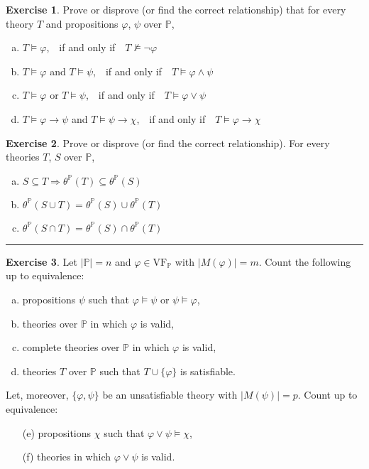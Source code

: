 \documentclass{amsart}
\theoremstyle{definition}
\newtheorem{problem}{Exercise}
\begin{document}
\begin{problem}
Prove or disprove (or find the correct relationship) that for every theory $T$ and propositions $\varphi$, $\psi$ over $\mathbb{P}$,
\begin{enumerate}[(a)]
\item $T \models \varphi$,\ \  if and only if\ \ $T \not\models \neg \varphi$
\item $T \models \varphi$ and $T \models \psi$,\ \ if and only if\ \ $T \models \varphi \wedge \psi$
\item $T \models \varphi$ or $T \models \psi$,\ \ if and only if\ \ $T \models \varphi \vee \psi$
\item $T \models \varphi \to \psi$ and $T \models \psi \to \chi$,\ \ if and only if\ \ $T \models \varphi \to \chi$
\end{enumerate}
\end{problem}

\begin{problem}
Prove or disprove (or find the correct relationship). For every theories $T$, $S$ over $\mathbb{P}$,
\begin{enumerate}[(a)]
\item $S\subseteq T \Rightarrow \theta^{\mathbb{P}}(T) \subseteq \theta^{\mathbb{P}}(S)$
\item $\theta^{\mathbb{P}}(S\cup T)=\theta^{\mathbb{P}}(S) \cup \theta^{\mathbb{P}}(T)$
\item $\theta^{\mathbb{P}}(S\cap T)=\theta^{\mathbb{P}}(S) \cap \theta^{\mathbb{P}}(T)$
\end{enumerate}
\end{problem}

\hrule

\begin{problem}
 Let $|\mathbb{P}|=n$ and $\varphi\in\mathrm{VF}_{\mathbb{P}}$ with $|M(\varphi)|=m$. Count the following up to equivalence:
\begin{enumerate}[(a)]
\item propositions $\psi$ such that $\varphi \models \psi$ or $\psi \models \varphi$,
\item theories over $\mathbb{P}$ in which $\varphi$ is valid,
\item complete theories over $\mathbb{P}$ in which $\varphi$ is valid,
\item theories $T$ over $\mathbb{P}$ such that $T \cup \{\varphi\}$ is satisfiable.
\end{enumerate}
Let, moreover, $\{\varphi,\psi\}$ be an unsatisfiable theory with $|M(\psi)|=p$. Count up to equivalence:
\begin{enumerate}[(a)]
\item[(e)] propositions $\chi$ such that $\varphi \vee \psi \models \chi$, 
\item[(f)] theories in which $\varphi \vee \psi$ is valid.
\end{enumerate}
\end{problem}
\end{document}
